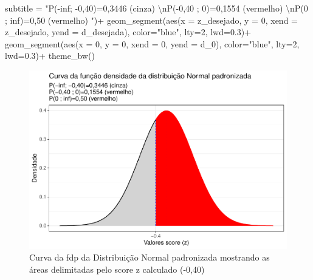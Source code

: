 \documentclass[
]{book}
\newenvironment{Shaded}{\begin{snugshade}}{\end{snugshade}}
\newcommand{\AttributeTok}[1]{\textcolor[rgb]{0.77,0.63,0.00}{#1}}
\newcommand{\DecValTok}[1]{\textcolor[rgb]{0.00,0.00,0.81}{#1}}
\newcommand{\FloatTok}[1]{\textcolor[rgb]{0.00,0.00,0.81}{#1}}
\newcommand{\FunctionTok}[1]{\textcolor[rgb]{0.00,0.00,0.00}{#1}}
\newcommand{\NormalTok}[1]{#1}
\newcommand{\SpecialCharTok}[1]{\textcolor[rgb]{0.00,0.00,0.00}{#1}}
\newcommand{\StringTok}[1]{\textcolor[rgb]{0.31,0.60,0.02}{#1}}
\begin{document}
\begin{Shaded}
\begin{Highlighting}[]
      \AttributeTok{subtitle =} \StringTok{"P({-}inf; {-}0,40)=0,3446 (cinza) }\SpecialCharTok{\textbackslash{}n}\StringTok{P({-}0,40 ; 0)=0,1554 (vermelho) }\SpecialCharTok{\textbackslash{}n}\StringTok{P(0 ; inf)=0,50 (vermelho) "}\NormalTok{)}\SpecialCharTok{+}
  \FunctionTok{geom\_segment}\NormalTok{(}\FunctionTok{aes}\NormalTok{(}\AttributeTok{x =}\NormalTok{ z\_desejado, }\AttributeTok{y =} \DecValTok{0}\NormalTok{, }\AttributeTok{xend =}\NormalTok{ z\_desejado, }\AttributeTok{yend =}\NormalTok{ d\_desejada), }\AttributeTok{color=}\StringTok{"blue"}\NormalTok{, }\AttributeTok{lty=}\DecValTok{2}\NormalTok{, }\AttributeTok{lwd=}\FloatTok{0.3}\NormalTok{)}\SpecialCharTok{+}
  \FunctionTok{geom\_segment}\NormalTok{(}\FunctionTok{aes}\NormalTok{(}\AttributeTok{x =} \DecValTok{0}\NormalTok{, }\AttributeTok{y =} \DecValTok{0}\NormalTok{, }\AttributeTok{xend =} \DecValTok{0}\NormalTok{, }\AttributeTok{yend =}\NormalTok{ d\_0), }\AttributeTok{color=}\StringTok{"blue"}\NormalTok{, }\AttributeTok{lty=}\DecValTok{2}\NormalTok{, }\AttributeTok{lwd=}\FloatTok{0.3}\NormalTok{)}\SpecialCharTok{+}
  \FunctionTok{theme\_bw}\NormalTok{()}
\end{Highlighting}
\end{Shaded}

\begin{figure}[H]

{\centering \includegraphics{apostila_files/figure-latex/fig25-1} 

}

\caption{Curva da fdp da Distribuição Normal padronizada mostrando as áreas delimitadas pelo score z calculado (-0,40)}\label{fig:fig25}
\end{figure}
\end{document}
